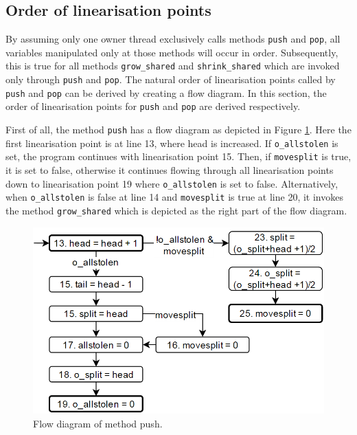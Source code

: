 \documentclass{sig-alternate-br}
\begin{document}
\subsection{Order of linearisation points}
By assuming only one owner thread exclusively calls methods \texttt{push} and \texttt{pop}, all variables manipulated only at those methods will occur in order.
Subsequently, this is true for all methods \texttt{grow\_shared} and \texttt{shrink\_shared} which are invoked only through \texttt{push} and \texttt{pop}.
The natural order of linearisation points called by \texttt{push} and \texttt{pop} can be derived by creating a flow diagram.
In this section, the order of linearisation points for \texttt{push} and \texttt{pop} are derived respectively.

First of all, the method \texttt{push} has a flow diagram as depicted in Figure \ref{fig:push}.
Here the first linearisation point is at line 13, where head is increased.
If \texttt{o\_allstolen} is set, the program continues with linearisation point 15.
Then, if \texttt{movesplit} is true, it is set to false, otherwise it continues flowing through all linearisation points down to linearisation point 19 where \texttt{o\_allstolen} is set to false.
Alternatively, when \texttt{o\_allstolen} is false at line 14 and \texttt{movesplit} is true at line 20, it invokes the method \texttt{grow\_shared} which is depicted as the right part of the flow diagram.
\begin{figure}[h]
	\centering
	\includegraphics[scale=0.35]{Push_flow_diagram_2.png}
	\caption{Flow diagram of method push.}
	\label{fig:push}
\end{figure}
\end{document}
